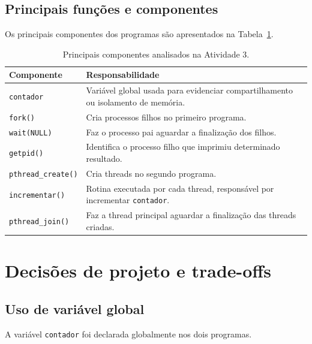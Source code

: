\subsection{Principais funções e componentes}

Os principais componentes dos programas são apresentados na Tabela~\ref{tab:atvd03-componentes}.

\begin{table}[htbp]
    \centering
    \caption{Principais componentes analisados na Atividade 3.}
    \label{tab:atvd03-componentes}
    \begin{tabular}{p{}|p{}}
        \hline
        \textbf{Componente} & \textbf{Responsabilidade} \\
        \hline
        \texttt{contador} &
        Variável global usada para evidenciar compartilhamento ou isolamento de memória. \\
        \hline
        \texttt{fork()} &
        Cria processos filhos no primeiro programa. \\
        \hline
        \texttt{wait(NULL)} &
        Faz o processo pai aguardar a finalização dos filhos. \\
        \hline
        \texttt{getpid()} &
        Identifica o processo filho que imprimiu determinado resultado. \\
        \hline
        \texttt{pthread\_create()} &
        Cria threads no segundo programa. \\
        \hline
        \texttt{incrementar()} &
        Rotina executada por cada thread, responsável por incrementar \texttt{contador}. \\
        \hline
        \texttt{pthread\_join()} &
        Faz a thread principal aguardar a finalização das threads criadas. \\
        \hline
    \end{tabular}
\end{table}

\section{Decisões de projeto e trade-offs}
\label{sec:atvd03-decisoes}

\subsection{Uso de variável global}

A variável \texttt{contador} foi declarada globalmente nos dois programas.

